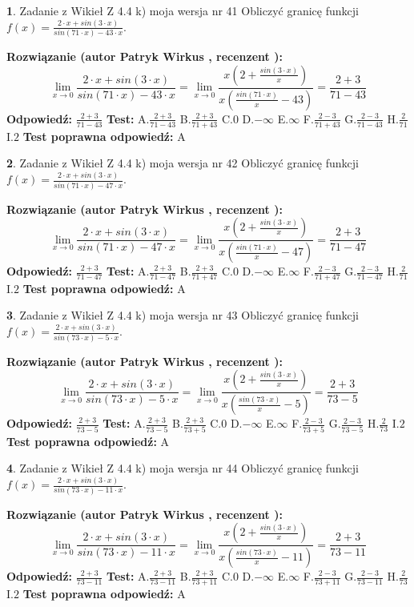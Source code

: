 \documentclass[12pt, a4paper]{article}
\theoremstyle{definition} %
\newtheorem{zad}{}
\newcommand{\zadStart}[1]{\begin{zad}#1\newline}
\newcommand{\zadStop}{\end{zad}}
\newcommand{\rozwStart}[2]{\noindent \textbf{Rozwiązanie (autor #1 , recenzent #2): }\newline}
\newcommand{\rozwStop}{\newline}
\newcommand{\odpStart}{\noindent \textbf{Odpowiedź:}\newline}
\newcommand{\odpStop}{\newline}
\newcommand{\testStart}{\noindent \textbf{Test:}\newline}
\newcommand{\testStop}{\newline}
\newcommand{\kluczStart}{\noindent \textbf{Test poprawna odpowiedź:}\newline}
\newcommand{\kluczStop}{\newline}
\begin{document}
\zadStart{Zadanie z Wikieł Z 4.4 k) moja wersja nr 41}
Obliczyć granicę funkcji $f(x)=\frac{2\cdot x +sin(3\cdot x)}{sin(71\cdot x) -43\cdot x}$.
\zadStop
\rozwStart{Patryk Wirkus}{}
$$\lim\limits_{x\to 0}\frac{2\cdot x +sin(3\cdot x)}{sin(71\cdot x) -43\cdot x}
=\lim\limits_{x\to 0}\frac{x(2+\frac{sin(3\cdot x)}{x})}{x(\frac{sin(71\cdot x)}{x}-43)}
=\frac{2+3}{71-43}$$
\rozwStop
\odpStart
$\frac{2+3}{71-43}$
\odpStop
\testStart
A.$\frac{2+3}{71-43}$
B.$\frac{2+3}{71+43}$
C.$0$
D.$-\infty$
E.$\infty$
F.$\frac{2-3}{71+43}$
G.$\frac{2-3}{71-43}$
H.$\frac{2}{71}$
I.$2$
\testStop
\kluczStart
A
\kluczStop



\zadStart{Zadanie z Wikieł Z 4.4 k) moja wersja nr 42}
Obliczyć granicę funkcji $f(x)=\frac{2\cdot x +sin(3\cdot x)}{sin(71\cdot x) -47\cdot x}$.
\zadStop
\rozwStart{Patryk Wirkus}{}
$$\lim\limits_{x\to 0}\frac{2\cdot x +sin(3\cdot x)}{sin(71\cdot x) -47\cdot x}
=\lim\limits_{x\to 0}\frac{x(2+\frac{sin(3\cdot x)}{x})}{x(\frac{sin(71\cdot x)}{x}-47)}
=\frac{2+3}{71-47}$$
\rozwStop
\odpStart
$\frac{2+3}{71-47}$
\odpStop
\testStart
A.$\frac{2+3}{71-47}$
B.$\frac{2+3}{71+47}$
C.$0$
D.$-\infty$
E.$\infty$
F.$\frac{2-3}{71+47}$
G.$\frac{2-3}{71-47}$
H.$\frac{2}{71}$
I.$2$
\testStop
\kluczStart
A
\kluczStop



\zadStart{Zadanie z Wikieł Z 4.4 k) moja wersja nr 43}
Obliczyć granicę funkcji $f(x)=\frac{2\cdot x +sin(3\cdot x)}{sin(73\cdot x) -5\cdot x}$.
\zadStop
\rozwStart{Patryk Wirkus}{}
$$\lim\limits_{x\to 0}\frac{2\cdot x +sin(3\cdot x)}{sin(73\cdot x) -5\cdot x}
=\lim\limits_{x\to 0}\frac{x(2+\frac{sin(3\cdot x)}{x})}{x(\frac{sin(73\cdot x)}{x}-5)}
=\frac{2+3}{73-5}$$
\rozwStop
\odpStart
$\frac{2+3}{73-5}$
\odpStop
\testStart
A.$\frac{2+3}{73-5}$
B.$\frac{2+3}{73+5}$
C.$0$
D.$-\infty$
E.$\infty$
F.$\frac{2-3}{73+5}$
G.$\frac{2-3}{73-5}$
H.$\frac{2}{73}$
I.$2$
\testStop
\kluczStart
A
\kluczStop



\zadStart{Zadanie z Wikieł Z 4.4 k) moja wersja nr 44}
Obliczyć granicę funkcji $f(x)=\frac{2\cdot x +sin(3\cdot x)}{sin(73\cdot x) -11\cdot x}$.
\zadStop
\rozwStart{Patryk Wirkus}{}
$$\lim\limits_{x\to 0}\frac{2\cdot x +sin(3\cdot x)}{sin(73\cdot x) -11\cdot x}
=\lim\limits_{x\to 0}\frac{x(2+\frac{sin(3\cdot x)}{x})}{x(\frac{sin(73\cdot x)}{x}-11)}
=\frac{2+3}{73-11}$$
\rozwStop
\odpStart
$\frac{2+3}{73-11}$
\odpStop
\testStart
A.$\frac{2+3}{73-11}$
B.$\frac{2+3}{73+11}$
C.$0$
D.$-\infty$
E.$\infty$
F.$\frac{2-3}{73+11}$
G.$\frac{2-3}{73-11}$
H.$\frac{2}{73}$
I.$2$
\testStop
\kluczStart
A
\kluczStop
\end{document}
